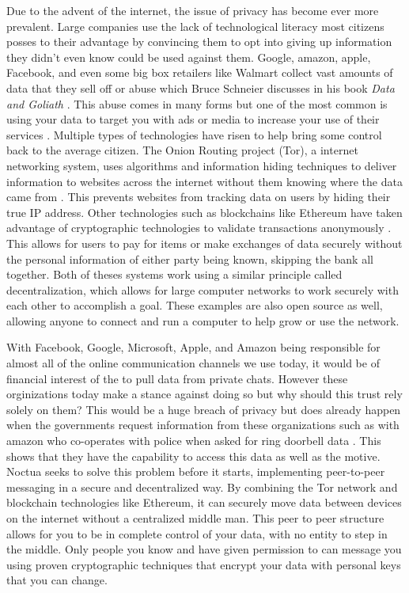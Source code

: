\documentclass[../main/main.tex]{subfiles}
\begin{document}
Due to the advent of the internet, the issue of privacy has become ever more prevalent. 
Large companies use the lack of technological literacy most citizens posses to their advantage by convincing them to opt into giving up information they didn’t even know could be used against them. 
Google, amazon, apple, Facebook, and even some big box retailers like Walmart collect vast amounts of data that they sell off or abuse which Bruce Schneier discusses in his book \textit{Data and Goliath} \cite{DATA}. 
This abuse comes in many forms but one of the most common is using your data to target you with ads or media to increase your use of their services \cite{DATA}. 
Multiple types of technologies have risen to help bring some control back to the average citizen. 
The Onion Routing project (Tor), a internet networking system, uses algorithms and information hiding techniques to deliver information to websites across the internet without them knowing where the data came from \cite{TOR}. 
This prevents websites from tracking data on users by hiding their true IP address. 
Other technologies such as blockchains like Ethereum have taken advantage of cryptographic technologies to validate transactions anonymously \cite{ETH}. 
This allows for users to pay for items or make exchanges of data securely without the personal information of either party being known, skipping the bank all together. 
Both of theses systems work using a similar principle called decentralization, which allows for large computer networks to work securely with each other to accomplish a goal. 
These examples are also open source as well, allowing anyone to connect and run a computer to help grow or use the network.

With Facebook, Google, Microsoft, Apple, and Amazon being responsible for almost all of the online communication channels we use today, it would be of financial interest of the to pull data from private chats. 
However these orginizations today make a stance against doing so but why should this trust rely solely on them?
This would be a huge breach of privacy but does already happen when the governments request information from these organizations such as with amazon who co-operates with police when asked for ring doorbell data \cite{RINGMASTER}. 
This shows that they have the capability to access this data as well as the motive. 
Noctua seeks to solve this problem before it starts, implementing peer-to-peer messaging in a secure and decentralized way. 
By combining the Tor network and blockchain technologies like Ethereum, it can securely move data between devices on the internet without a centralized middle man. 
This peer to peer structure allows for you to be in complete control of your data, with no entity to step in the middle. 
Only people you know and have given permission to can message you using proven cryptographic techniques that encrypt your data with personal keys that you can change. 
\end{document}
